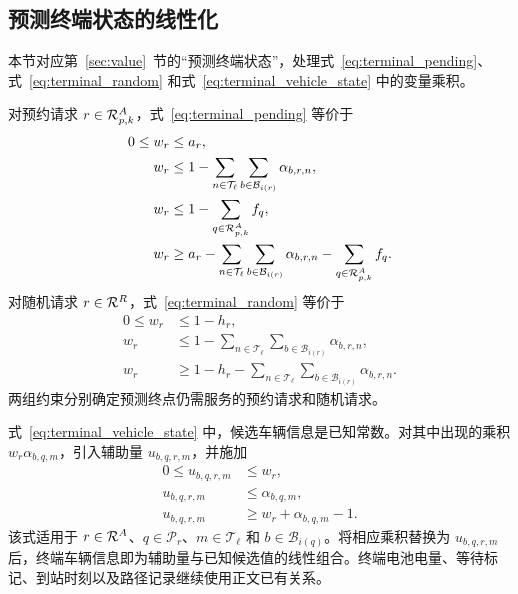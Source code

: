 \subsection{预测终端状态的线性化}
\label{lin:terminal_state_section}
本节对应第~\ref{sec:value}~节的“预测终端状态”，处理式~\eqref{eq:terminal_pending}、式~\eqref{eq:terminal_random} 和式~\eqref{eq:terminal_vehicle_state} 中的变量乘积。

对预约请求 $r\in\mathcal R_{p,k}^A$，式~\eqref{eq:terminal_pending} 等价于
\begin{equation}
\begin{aligned}
0\le w_r&\le a_r,\\
w_r&\le1-\sum_{n\in\mathcal T_\ell}
\sum_{b\in\mathcal B_{i(r)}}\alpha_{b,r,n},\\
w_r&\le1-\sum_{q\in\mathcal R_{p,k}^A}f_q,\\
w_r&\ge a_r-\sum_{n\in\mathcal T_\ell}
\sum_{b\in\mathcal B_{i(r)}}\alpha_{b,r,n}
-\sum_{q\in\mathcal R_{p,k}^A}f_q.
\end{aligned}
\label{lin:terminal_pending}
\end{equation}
对随机请求 $r\in\mathcal R^R$，式~\eqref{eq:terminal_random} 等价于
\begin{equation}
\begin{aligned}
0\le w_r&\le1-h_r,\\
w_r&\le1-\sum_{n\in\mathcal T_\ell}
\sum_{b\in\mathcal B_{i(r)}}\alpha_{b,r,n},\\
w_r&\ge1-h_r-\sum_{n\in\mathcal T_\ell}
\sum_{b\in\mathcal B_{i(r)}}\alpha_{b,r,n}.
\end{aligned}
\label{lin:terminal_random}
\end{equation}
两组约束分别确定预测终点仍需服务的预约请求和随机请求。

式~\eqref{eq:terminal_vehicle_state} 中，候选车辆信息是已知常数。对其中出现的乘积 $w_r\alpha_{b,q,m}$，引入辅助量 $u_{b,q,r,m}$，并施加
\begin{equation}
\begin{aligned}
0\le u_{b,q,r,m}&\le w_r,\\
u_{b,q,r,m}&\le\alpha_{b,q,m},\\
u_{b,q,r,m}&\ge w_r+\alpha_{b,q,m}-1.
\end{aligned}
\label{lin:terminal_vehicle_product}
\end{equation}
该式适用于 $r\in\mathcal R^A$、$q\in\mathcal P_r$、$m\in\mathcal T_\ell$ 和 $b\in\mathcal B_{i(q)}$。将相应乘积替换为 $u_{b,q,r,m}$ 后，终端车辆信息即为辅助量与已知候选值的线性组合。终端电池电量、等待标记、到站时刻以及路径记录继续使用正文已有关系。


